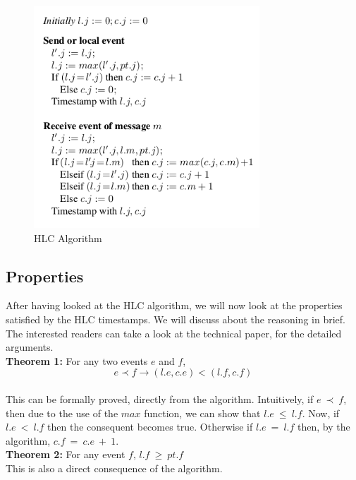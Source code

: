 \documentclass{article}
\begin{document}
    \begin{figure}[h!]
        \begin{center}
        \includegraphics[resolution=125]{algorithm.png}
        \end{center}
        \caption{HLC Algorithm}
    \end{figure}

    \subsection{Properties}

    After having looked at the HLC algorithm, we will now look at the properties satisfied by the HLC timestamps. We will discuss about the reasoning in brief. The interested readers can take a look at the technical paper, for the detailed arguments. \\

    \noindent \textbf{Theorem 1:} For any two events $e$ and $f$, $$e \prec f \rightarrow (l.e,c.e) < (l.f,c.f)$$ \\

    This can be formally proved, directly from the algorithm. Intuitively, if $e\ \prec\ f$, then due to the use of the $max$ function, we can show that $l.e\ \leq\ l.f$. Now, if $l.e\ <\ l.f$ then the consequent becomes true. Otherwise if $l.e\ =\ l.f$ then, by the algorithm, $c.f\ =\ c.e\ +\ 1$. \\

    \noindent \textbf{Theorem 2:} For any event $f$, $l.f\ \geq\ pt.f$ \\

    This is also a direct consequence of the algorithm. \\
\end{document}
